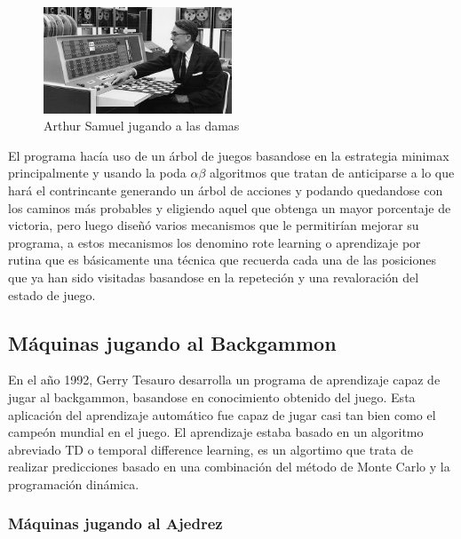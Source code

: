 \documentclass[a4paper, 11pt]{article} %
\begin{document}
\begin{figure}[H]
\centering
\includegraphics[width=0.5\textwidth]{acc}
\caption{Arthur Samuel jugando a las damas}
\label{Ejemplo kNN}
\end{figure}

El programa hacía uso de un árbol de juegos basandose en la estrategia minimax principalmente y usando la poda $\alpha\beta$ algoritmos que tratan de anticiparse a lo que hará el contrincante generando un árbol de acciones y podando quedandose con los caminos más probables y eligiendo aquel que obtenga un mayor porcentaje de victoria, pero luego diseñó varios mecanismos que le permitirían mejorar su programa, a estos mecanismos los denomino rote learning o aprendizaje por rutina que es básicamente una técnica que recuerda cada una de las posiciones que ya han sido visitadas basandose en la repeteción y una revaloración del estado de juego.

\subsection{Máquinas jugando al Backgammon}
En el año 1992, Gerry Tesauro desarrolla un programa de aprendizaje capaz de jugar al backgammon, basandose en conocimiento obtenido del juego. Esta aplicación del aprendizaje automático fue capaz de jugar casi tan bien como el campeón mundial en el juego. El aprendizaje estaba basado en un algoritmo abreviado TD o temporal difference learning, es un algortimo que trata de realizar predicciones basado en una combinación del método de Monte Carlo y la programación dinámica.

\subsubsection{Máquinas jugando al Ajedrez}
\end{document}
